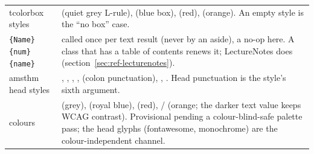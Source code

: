 \begin{center}
\begin{tabularx}{\linewidth}{@{}l Y@{}}
tcolorbox styles &  (quiet grey L-rule),
   (blue box),  (red), 
  (orange). An empty style is the ``no box'' case.\\
\texttt{\{Name\}\{num\}\{name\}} & called once per
  text result (never by an aside), a no-op here. A class that has a table
  of contents renews it; LectureNotes does
  (section~\ref{sec:ref-lecturenotes}).\\
amsthm head styles & , , ,
  ,  (colon punctuation), ,
  . Head punctuation is the style's sixth argument.\\
colours &  (grey),  (royal blue),
   (red),  / 
  (orange; the darker text value keeps WCAG contrast). Provisional
  pending a colour-blind-safe palette pass; the head glyphs
  (fontawesome, monochrome) are the colour-independent channel.\\
\end{tabularx}
\end{center}
